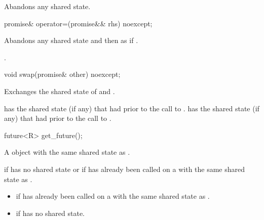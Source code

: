 \begin{itemdescr}
\pnum
\effects
Abandons any shared state.
\end{itemdescr}

%
\begin{itemdecl}
promise& operator=(promise&& rhs) noexcept;
\end{itemdecl}

\begin{itemdescr}
\pnum
\effects
Abandons any shared state and then as if
.

\pnum
\returns {}.
\end{itemdescr}

%
\begin{itemdecl}
void swap(promise& other) noexcept;
\end{itemdecl}

\begin{itemdescr}
\pnum
\effects Exchanges the shared state of  and .

\pnum
\postconditions {} has the shared state (if any) that  had
prior to the call to .  has the shared state (if any) that
 had prior to the call to .
\end{itemdescr}

%
\begin{itemdecl}
future<R> get_future();
\end{itemdecl}

\begin{itemdescr}
\pnum
\returns A  object with the same shared state as
.

\pnum
\throws {} if  has no shared state or if
 has already been called on a  with the same
shared state as .

\pnum
\errors

\begin{itemize}
\item {} if  has already been called on
a  with the same shared state as .

\item {} if  has no shared state.
\end{itemize}
\end{itemdescr}

